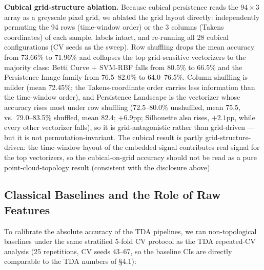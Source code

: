 \documentclass[12pt, a4paper]{report}
\theoremstyle{definition}
\theoremstyle{plain}
\theoremstyle{remark}
\begin{document}
\textbf{Cubical grid-structure ablation.} Because cubical
persistence reads the $94 \times 3$ array as a greyscale pixel grid,
we ablated the grid layout directly: independently permuting the 94
rows (time-window order) or the 3 columns (Takens coordinates) of
each sample, labels intact, and re-running all 28 cubical
configurations (CV seeds as the sweep).
Row shuffling drops the mean accuracy from 73.66\% to 71.96\% and
collapses the top grid-sensitive vectorizers to the majority class:
Betti Curve + SVM-RBF falls from 80.5\% to 66.5\% and the
Persistence Image family from 76.5--82.0\% to 64.0--76.5\%.
Column shuffling is milder (mean 72.45\%; the Takens-coordinate order
carries less information than the time-window order), and
Persistence Landscape is the vectorizer whose accuracy rises most under
row shuffling (72.5--80.0\% unshuffled, mean 75.5, vs.\ 79.0--83.5\%
shuffled, mean 82.4; $+6.9$pp; Silhouette also rises, $+2.1$pp, while
every other vectorizer falls), so it is grid-antagonistic rather than
grid-driven --- but it is not permutation-invariant. The cubical result is
partly grid-structure-driven: the time-window layout of the
embedded signal contributes real signal for the top vectorizers, so
the cubical-on-grid accuracy should not be read as a pure
point-cloud-topology result (consistent with the disclosure above).

\subsection{Classical Baselines and the Role of Raw Features}

To calibrate the absolute accuracy of the TDA pipelines, we ran
non-topological baselines under the same stratified 5-fold CV
protocol as the TDA repeated-CV analysis (25 repetitions, CV seeds
43--67, so the baseline CIs are directly comparable to the TDA
numbers of \S4.1):
\end{document}
